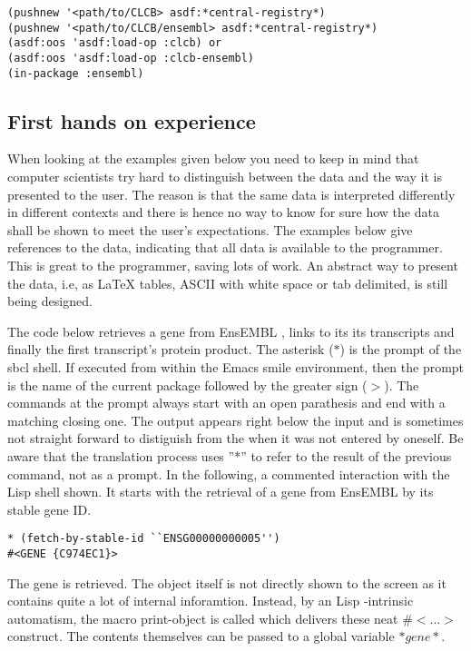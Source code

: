 \documentclass{book}
\newcommand\ensembl{EnsEMBL }
\newcommand\lisp{Lisp }
\begin{document}
\lstset{language=lisp}
\begin{lstlisting}
(pushnew '<path/to/CLCB> asdf:*central-registry*)
(pushnew '<path/to/CLCB/ensembl> asdf:*central-registry*)
(asdf:oos 'asdf:load-op :clcb) or
(asdf:oos 'asdf:load-op :clcb-ensembl)
(in-package :ensembl)
\end{lstlisting}

\subsection{First hands on experience}

When looking at the examples given below you need to keep in mind that
computer scientists try hard to distinguish between the data and the
way it is presented to the user. The reason is that the same data
is interpreted differently in different contexts and there is hence
no way to know for sure how the data shall be shown to meet the user's
expectations. The examples below give references to the data, indicating
that all data is available to the programmer. This is great to the
programmer, saving lots of work. An abstract way to present the data,
i.e, as LaTeX tables, ASCII with white space or tab delimited, is still
being designed.

The code below retrieves a gene from \ensembl, links to its its
transcripts and finally the first transcript's protein product. The
asterisk ($*$) is the prompt of the sbcl shell. If executed from within
the Emacs smile environment, then the prompt is the name of the current
package followed by the greater sign ($>$).  The commands at the prompt
always start with an open parathesis and end with a matching closing
one. The output appears right below the input and is sometimes not
straight forward to distiguish from the when it was not entered by
oneself.  Be aware that the translation process uses ''*'' to refer to
the result of the previous command, not as a prompt. In the following,
a commented interaction with the \lisp shell shown. It starts with the
retrieval of a gene from \ensembl by its stable gene ID.

\begin{lstlisting}
* (fetch-by-stable-id ``ENSG00000000005'')
#<GENE {C974EC1}>
\end{lstlisting}

The gene is retrieved. The object itself is not directly shown to the
screen as it contains quite a lot of internal inforamtion. Instead, by
an \lisp-intrinsic automatism, the macro print-object is called which
delivers these neat $\#<\ldots>$ construct. The contents themselves can
be passed to a global variable $*gene*$.
\end{document}
